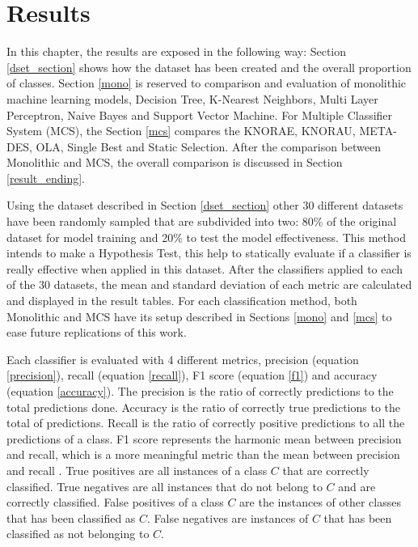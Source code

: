 \chapter{Results}

In this chapter, the results are exposed in the following way: Section \ref{dset_section} shows how the dataset has been created and the overall proportion of classes. Section \ref{mono} is reserved to comparison and evaluation of monolithic machine learning models, Decision Tree, K-Nearest Neighbors, Multi Layer Perceptron, Naive Bayes and Support Vector Machine. For Multiple Classifier System (MCS), the Section \ref{mcs} compares the KNORAE, KNORAU, META-DES, OLA, Single Best and Static Selection. After the comparison between Monolithic and MCS, the overall comparison is discussed in Section \ref{result_ending}.

Using the dataset described in Section \ref{dset_section} other 30 different datasets have been randomly sampled that are subdivided into two: 80\% of the original dataset for model training and 20\% to test the model effectiveness. This method intends to make a Hypothesis Test, this help to statically evaluate if a classifier is really effective when applied in this dataset. After the classifiers applied to each of the 30 datasets, the mean and standard deviation of each metric are calculated and displayed in the result tables. For each classification method, both Monolithic and MCS have its setup described in Sections \ref{mono} and \ref{mcs} to ease future replications of this work. 

Each classifier is evaluated with 4 different metrics, precision (equation \ref{precision}), recall (equation \ref{recall}), F1 score (equation \ref{f1}) and accuracy (equation \ref{accuracy}). The precision is the ratio of correctly predictions to the total predictions done. Accuracy is the ratio of correctly true predictions to the total of predictions. Recall is the ratio of correctly positive predictions to all the predictions of a class. F1 score represents the harmonic mean between precision and recall, which is a more meaningful metric than the mean between precision and recall \cite{sasaki2007truth}. True positives are all instances of a class $C$ that are correctly classified. True negatives are all instances that do not belong to $C$ and are correctly classified. False positives of a class $C$ are the instances of other classes that has been classified as $C$. False negatives are instances of $C$ that has been classified as not belonging to $C$.

